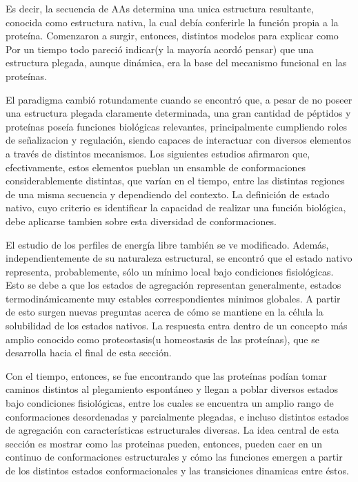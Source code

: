 Es decir, la secuencia de AAs determina una unica estructura resultante, conocida como estructura nativa, la cual debía conferirle la función propia a la proteína.
Comenzaron a surgir, entonces, distintos modelos para explicar como 
Por un tiempo todo pareció indicar(y la mayoría acordó pensar) que una estructura plegada, aunque dinámica, era la base del mecanismo funcional en las proteínas.

El paradigma cambió rotundamente cuando se encontró que, a pesar de no poseer una estructura plegada claramente determinada, una gran cantidad de péptidos y proteínas poseía funciones biológicas relevantes,
principalmente cumpliendo roles de señalizacion y regulación, siendo capaces de interactuar con diversos elementos a través de distintos mecanismos.
Los siguientes estudios afirmaron que, efectivamente, estos elementos pueblan un ensamble de conformaciones considerablemente distintas, que varían en el tiempo, entre las distintas regiones de una misma secuencia y dependiendo del contexto.
La definición de estado nativo, cuyo criterio es identificar la capacidad de realizar una función biológica, debe aplicarse tambien sobre esta diversidad de conformaciones.



El estudio de los perfiles de energía libre también se ve modificado. 
Además, independientemente de su naturaleza estructural, se encontró que el estado nativo representa, probablemente, sólo un mínimo local bajo condiciones fisiológicas.
Esto se debe a que los estados de agregación representan generalmente, estados termodinámicamente muy estables correspondientes minimos globales. 
A partir de esto surgen nuevas preguntas acerca de cómo se mantiene en la célula la solubilidad de los estados nativos.
La respuesta entra dentro de un concepto más amplio conocido como proteostasis(u homeostasis de las proteínas), que se desarrolla hacia el final de esta sección.

Con el tiempo, entonces, se fue encontrando que las proteínas podían tomar caminos distintos al plegamiento espontáneo y llegan a poblar diversos estados bajo condiciones fisiológicas, 
entre los cuales se encuentra un amplio rango de conformaciones desordenadas y parcialmente plegadas, e incluso distintos estados de agregación con características estructurales diversas.
La idea central de esta sección es mostrar como las proteinas pueden, entonces, pueden caer en un continuo de conformaciones estructurales y cómo las funciones 
emergen a partir de los distintos estados conformacionales y las transiciones dinamicas entre éstos.

